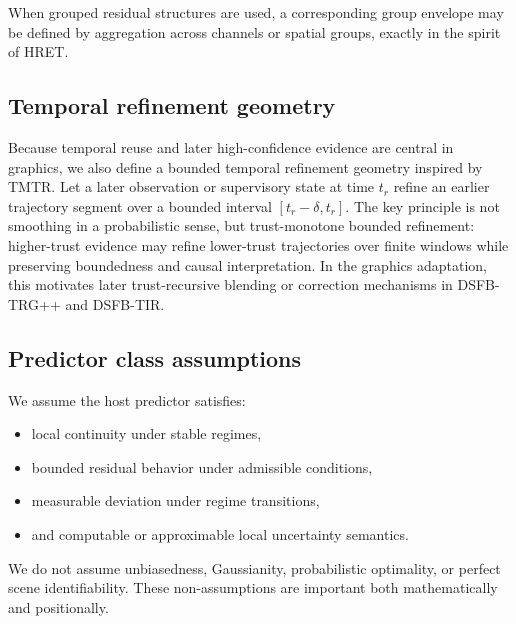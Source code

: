 \documentclass[11pt,letterpaper]{article}
\theoremstyle{gcresult}
\theoremstyle{definition}
\begin{document}
When grouped residual structures are used, a corresponding group envelope may be defined by aggregation across channels or spatial groups, exactly in the spirit of HRET. 


\subsection{Temporal refinement geometry}

Because temporal reuse and later high-confidence evidence are central in graphics, we also define a bounded temporal refinement geometry inspired by TMTR. Let a later observation or supervisory state at time $t_r$ refine an earlier trajectory segment over a bounded interval $[t_r-\delta,t_r]$. The key principle is not smoothing in a probabilistic sense, but trust-monotone bounded refinement: higher-trust evidence may refine lower-trust trajectories over finite windows while preserving boundedness and causal interpretation. In the graphics adaptation, this motivates later trust-recursive blending or correction mechanisms in DSFB-TRG++ and DSFB-TIR. 


\subsection{Predictor class assumptions}

We assume the host predictor satisfies:
\begin{itemize}[leftmargin=1.5em]
    \item local continuity under stable regimes,
    \item bounded residual behavior under admissible conditions,
    \item measurable deviation under regime transitions,
    \item and computable or approximable local uncertainty semantics.
\end{itemize}

We do not assume unbiasedness, Gaussianity, probabilistic optimality, or perfect scene identifiability. These non-assumptions are important both mathematically and positionally.

\end{document}
